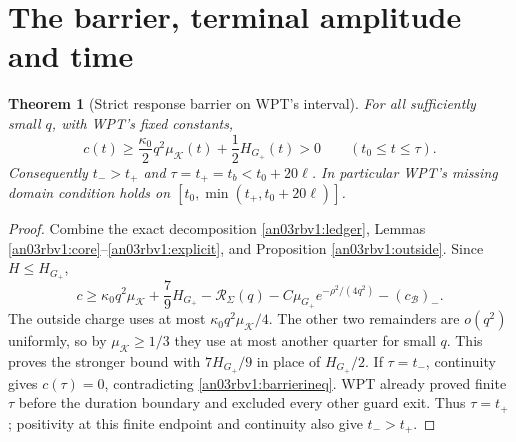 \documentclass[11pt]{article}
\numberwithin{equation}{section}
\newtheorem{theorem}{Theorem}[section]
\theoremstyle{remark}\newtheorem{remark}[theorem]{Remark}
\newcommand{\KK}{\mathcal K}
\newcommand{\BB}{\mathcal B}
\newcommand{\Gp}{G_+}
\begin{document}
\section{The barrier, terminal amplitude and time}
\begin{theorem}[Strict response barrier on WPT's interval]
\label{an03rbv1:barrier}
For all sufficiently small $q$, with WPT's fixed constants,
\begin{equation}
 c(t)\ge\frac{\kappa_0}{2}q^2\mu_{\KK}(t)
                         +\frac12 H_{\Gp}(t)>0
 \qquad(t_0\le t\le\tau).
 \label{an03rbv1:barrierineq}
\end{equation}
Consequently $t_->t_+$ and $\tau=t_+=t_b<t_0+20\ell$.
In particular WPT's missing domain condition holds on
$[t_0,\min(t_+,t_0+20\ell)]$.
\end{theorem}
\begin{proof}
Combine the exact decomposition \eqref{an03rbv1:ledger},
Lemmas \ref{an03rbv1:core}--\ref{an03rbv1:explicit}, and
Proposition \ref{an03rbv1:outside}. Since $H\le H_{\Gp}$,
\[
 c\ge\kappa_0q^2\mu_{\KK}+\frac79H_{\Gp}
 -\mathcal R_\Sigma(q)-C\mu_{\Gp}e^{-\rho^2/(4q^2)}
 -(c_{\BB})_-.
\]
The outside charge uses at most $\kappa_0q^2\mu_{\KK}/4$.
The other two remainders are $o(q^2)$ uniformly, so by
$\mu_{\KK}\ge1/3$ they use at most another quarter for small $q$.
This proves the stronger bound with $7H_{\Gp}/9$ in place of
$H_{\Gp}/2$. If $\tau=t_-$, continuity gives $c(\tau)=0$,
contradicting \eqref{an03rbv1:barrierineq}. WPT already proved
finite $\tau$ before the duration boundary and excluded every
other guard exit. Thus $\tau=t_+$; positivity at this finite
endpoint and continuity also give $t_->t_+$.
\end{proof}
\end{document}
